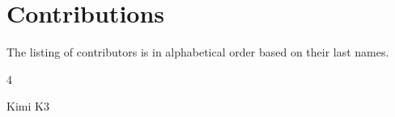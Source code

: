 \section{Contributions}
The listing of contributors is in alphabetical order based on their last names. 

\begin{multicols}{4}
{
\small

Kimi K3\\
}
\end{multicols}
\newpage